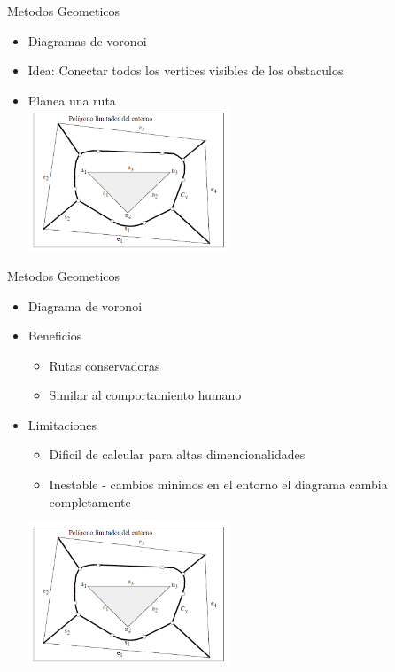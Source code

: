 \documentclass[
	11pt, %
]{beamer}
\begin{document}
\begin{frame}{Metodos Geometicos}
  \begin{itemize}
  \item Diagramas de voronoi\\
  \item Idea: Conectar todos los vertices visibles  de los obstaculos\\
  \item Planea una ruta\\
    \centering
    \bigskip %
    \includegraphics[width=6cm]{voronoi}
  \end{itemize}
\end{frame}

\begin{frame}{Metodos Geometicos}
  \begin{itemize}
  \item Diagrama de voronoi\\
  \item Beneficios\\
    \begin{itemize}
    \item Rutas conservadoras
    \item Similar al comportamiento humano
    \end{itemize}
  \item Limitaciones\\
    \begin{itemize}
    \item Dificil de calcular para altas dimencionalidades
    \item Inestable - cambios minimos en el entorno el diagrama cambia completamente
    \end{itemize}    
    \centering
    \bigskip %
    \includegraphics[width=6cm]{voronoi}
  \end{itemize}
\end{frame}
\end{document}

